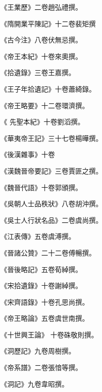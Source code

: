 \begin{pinyinscope}
 《王業歷》二卷趙弘禮撰。



 《隋開業平陳記》十二卷裴矩撰



 《古今注》八卷伏無忌撰。



 《帝王本紀》十卷來奧撰。



 《拾遺錄》三卷王嘉撰。



 《王子年拾遺記》十卷蕭綺錄。



 《帝王略要》十二卷環濟撰。



 《
 先聖本紀》十卷劉滔撰。



 《華夷帝王記》三十七卷楊曄撰。



 《後漢雜事》十卷



 《漢魏晉帝要記》三卷賈匪之撰。



 《魏晉代語》十卷郭頒撰。



 《吳朝人士品秩狀》八卷胡沖撰。



 《吳士人行狀名品》二卷虞尚撰。



 《江表傳》五卷虞溥撰。



 《晉諸公贊》二十二卷傅暢撰。



 《晉後略記》五卷荀綽撰。



 《宋拾遺錄》十卷謝綽撰。



 《宋齊語錄》十卷孔思尚撰。



 《帝王略論》五卷虞世南撰。



 《十世興王論》
 十卷硃敬則撰。



 《洞歷記》九卷周樹撰。



 《帝系譜》二卷張愔等撰。



 《洞記》九卷韋昭撰。




\end{pinyinscope}
